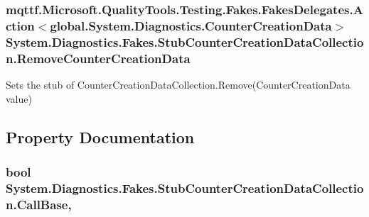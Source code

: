 \hypertarget{class_system_1_1_diagnostics_1_1_fakes_1_1_stub_counter_creation_data_collection_ac133adbc3d47b47cbcf9e03f512aa338}{
\subsubsection[{Remove\-Counter\-Creation\-Data}]{\setlength{\rightskip}{0pt plus 5cm}mqttf.\-Microsoft.\-Quality\-Tools.\-Testing.\-Fakes.\-Fakes\-Delegates.\-Action$<$global.\-System.\-Diagnostics.\-Counter\-Creation\-Data$>$ System.\-Diagnostics.\-Fakes.\-Stub\-Counter\-Creation\-Data\-Collection.\-Remove\-Counter\-Creation\-Data}}\label{class_system_1_1_diagnostics_1_1_fakes_1_1_stub_counter_creation_data_collection_ac133adbc3d47b47cbcf9e03f512aa338}


Sets the stub of Counter\-Creation\-Data\-Collection.\-Remove(\-Counter\-Creation\-Data value)



\subsection{Property Documentation}
\hypertarget{class_system_1_1_diagnostics_1_1_fakes_1_1_stub_counter_creation_data_collection_a03d65951da82d1b79bd5939ec7036ca3}{
\subsubsection[{Call\-Base}]{\setlength{\rightskip}{0pt plus 5cm}bool System.\-Diagnostics.\-Fakes.\-Stub\-Counter\-Creation\-Data\-Collection.\-Call\-Base\hspace{0.3cm}{\ttfamily [get]}, {\ttfamily [set]}}}\label{class_system_1_1_diagnostics_1_1_fakes_1_1_stub_counter_creation_data_collection_a03d65951da82d1b79bd5939ec7036ca3}


